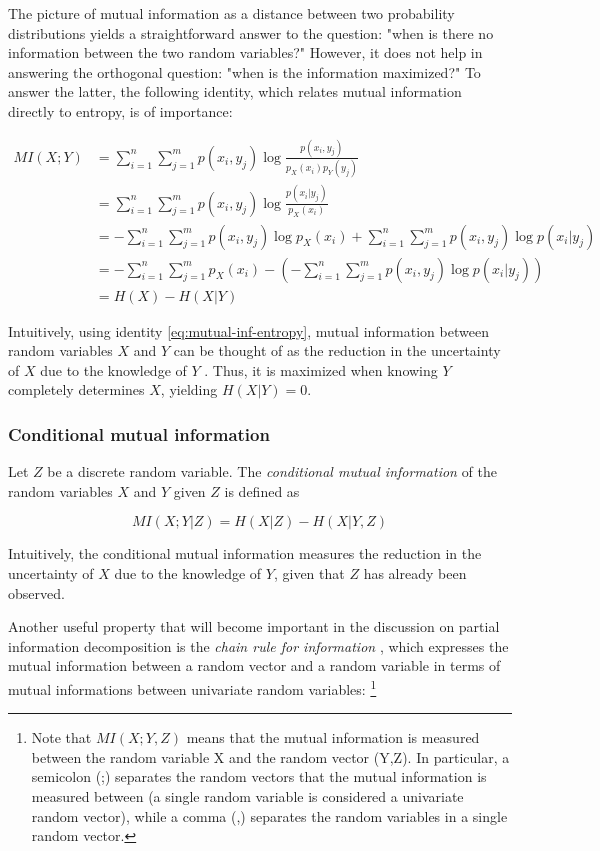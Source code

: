 \documentclass[12pt]{article}
\begin{document}
The picture of mutual information as a distance between two probability distributions yields a straightforward answer to the question: "when is there no information between the two random variables?" However, it does not help in answering the orthogonal question: "when is the information maximized?" To answer the latter, the following identity, which relates mutual information directly to entropy, is of importance: 

\begin{align}
MI(X;Y) & = \sum_{i=1}^n \sum_{j=1}^m p(x_i,y_j) \log \frac{p(x_i,y_j)}{p_X(x_i)p	_Y(y_j)} \nonumber \\
		& = \sum_{i=1}^n \sum_{j=1}^m p(x_i, y_j) \log \frac{p(x_i|y_j)}{p_X(x_i)} \nonumber \\ 
 		& = -\sum_{i=1}^n \sum_{j=1}^m p(x_i,y_j) \log p_X(x_i) +\sum_{i=1}^n \sum_{j=1}^m p(x_i,y_j) \log p(x_i|y_j) \nonumber \\
 		& = -\sum_{i=1}^n \sum_{j=1}^m p_X(x_i) - \left( - \sum_{i=1}^n \sum_{j=1}^m p(x_i,y_j) \log p(x_i|y_j) \right) \nonumber \\ 
 		& = H(X) - H(X|Y)
\label{eq:mutual-inf-entropy} 
\end{align}

Intuitively, using identity \ref{eq:mutual-inf-entropy}, mutual information between random variables $X$ and $Y$ can be thought of as the reduction in the uncertainty of $X$ due to the knowledge of $Y$ \cite{cover-thomas}. Thus, it is maximized when knowing $Y$ completely determines $X$, yielding $H(X|Y) = 0$.  

\subsubsection{Conditional mutual information}

Let $Z$ be a discrete random variable. The \textit{conditional mutual information} \cite{cover-thomas} of the random variables $X$ and $Y$ given $Z$ is defined as

\begin{equation}
MI(X;Y|Z) = H(X|Z) - H(X|Y,Z)
\end{equation}

Intuitively, the conditional mutual information measures the reduction in the uncertainty of $X$ due to the knowledge of $Y$, given that $Z$ has already been observed. 

Another useful property that will become important in the discussion on partial information decomposition is the \textit{chain rule for information} \cite{cover-thomas}, which expresses the mutual information between a random vector and a random variable in terms of mutual informations between univariate random variables: \footnote{Note that $MI(X;Y,Z)$ means that the mutual information is measured between the random variable X and the random vector (Y,Z). In particular, a semicolon (;) separates the random vectors that the mutual information is measured between (a single random variable is considered a univariate random vector), while a comma (,) separates the random variables in a single random vector.}
\end{document}
